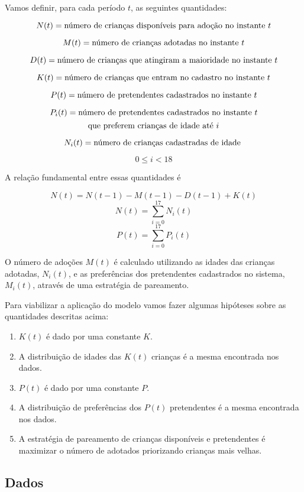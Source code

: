 \documentclass[]{book}
\begin{document}
Vamos definir, para cada período \(t\), as seguintes quantidades:

\[N(t) = \hbox{número de crianças disponíveis para adoção no instante } t \]

\[M(t) = \hbox{número de crianças adotadas no instante }t \]

\[D(t) = \hbox{número de crianças que atingiram a maioridade no instante }t \]

\[K(t) = \hbox{número de crianças que entram no cadastro no instante }t \]

\[P(t) = \hbox{número de pretendentes cadastrados no instante }t\]

\[P_i(t) = \hbox{número de pretendentes cadastrados no instante } t \]
\[\hbox{que preferem crianças de idade até }i \]

\[N_i(t) = \hbox{número de crianças cadastradas de idade } \]

\[0 \leq i < 18\]

A relação fundamental entre essas quantidades é

\[N(t) = N(t-1)-M(t-1)-D(t-1)+K(t)\] \[N(t) = \sum_{i=0}^{17}N_i(t)\]
\[P(t) = \sum_{i=0}^{17}P_i(t)\]

O número de adoções \(M(t)\) é calculado utilizando as idades das
crianças adotadas, \(N_i(t)\), e as preferências dos pretendentes
cadastrados no sistema, \(M_i(t)\), através de uma estratégia de
pareamento.

Para viabilizar a aplicação do modelo vamos fazer algumas hipóteses
sobre as quantidades descritas acima:

\begin{enumerate}
\def\labelenumi{\arabic{enumi}.}
\item
  \(K(t)\) é dado por uma constante \(K\).
\item
  A distribuição de idades das \(K(t)\) crianças é a mesma encontrada
  nos dados.
\item
  \(P(t)\) é dado por uma constante \(P\).
\item
  A distribuição de preferências dos \(P(t)\) pretendentes é a mesma
  encontrada nos dados.
\item
  A estratégia de pareamento de crianças disponíveis e pretendentes é
  maximizar o número de adotados priorizando crianças mais velhas.
\end{enumerate}

\subsection{Dados}\label{dados-1}
\end{document}
